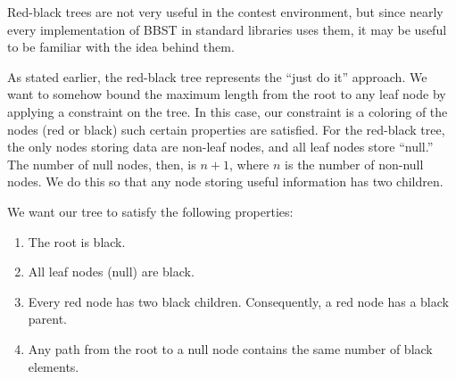 Red-black trees are not very useful in the contest environment, but since nearly every implementation of BBST in standard libraries uses them, it may be useful to be familiar with the idea behind them.

As stated earlier, the red-black tree represents the ``just do it'' approach. We want to somehow bound the maximum length from the root to any leaf node by applying a constraint on the tree. In this case, our constraint is a coloring of the nodes (red or black) such certain properties are satisfied. For the red-black tree, the only nodes storing data are non-leaf nodes, and all leaf nodes store ``null.'' The number of null nodes, then, is $n+1$, where $n$ is the number of non-null nodes. We do this so that any node storing useful information has two children.

We want our tree to satisfy the following properties:

\begin{enumerate}

\item
The root is black.

\item
All leaf nodes (null) are black.

\item
Every red node has two black children. Consequently, a red node has a black parent.

\item
Any path from the root to a null node contains the same number of black elements.

\end{enumerate}

